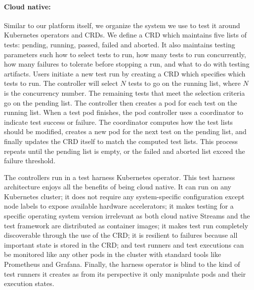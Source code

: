 \paragraph{Cloud native:} Similar to our platform itself, we organize the system
we use to test it around Kubernetes operators and CRDs. We define a
 CRD which maintains five lists of tests: pending, running,
passed, failed and aborted. It also maintains testing parameters such how to
select tests to run, how many tests to run concurrently, how many failures to
tolerate before stopping a run, and what to do with testing artifacts.  Users
initiate a new test run by creating a  CRD which specifies which
tests to run. The  controller will select $N$ tests to go on the
running list, where $N$ is the concurrency number. The remaining tests that meet
the selection criteria go on the pending list. The  controller
then creates a pod for each test on the running list.  When a test pod finishes,
the pod controller uses a  coordinator to indicate test success
or failure. The coordinator computes how the test lists should be modified,
creates a new pod for the next test on the pending list, and finally updates the
CRD itself to match the computed test lists.  This process repeats until the
pending list is empty, or the failed and aborted list exceed the failure
threshold.

The  controllers run in a test harness Kubernetes operator. This
test harness architecture enjoys all the benefits of being cloud native. It can
run on any Kubernetes cluster; it does not require any system-specific
configuration except node labels to expose available hardware accelerators; it
makes testing for a specific operating system version irrelevant as both cloud
native Streams and the test framework are distributed as container images; it
makes test run completely discoverable through the use of the 
CRD; it is resilient to failures because all important state is stored in the
CRD; and test runners and test executions can be monitored like any other pods
in the cluster with standard tools like Prometheus and Grafana. Finally, the
harness operator is blind to the kind of test runners it creates as from its
perspective it only manipulate pods and their execution states.
